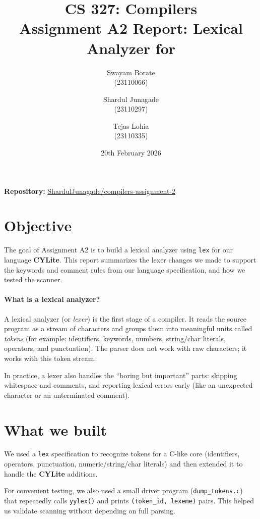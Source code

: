 \documentclass[11pt]{article}
\title{CS 327: Compilers\\Assignment A2 Report: Lexical Analyzer for \lang}
\author{Swayam Borate\\(23110066) \and Shardul Junagade\\(23110297) \and Tejas Lohia\\(23110335)}
\date{20th February 2026}
\newcommand{\lang}{\textbf{CYLite}}
\begin{document}
\maketitle

\noindent\textbf{Repository:} \href{https://github.com/ShardulJunagade/compilers-assignment-2}{ShardulJunagade/compilers-assignment-2}

\section{Objective}
The goal of Assignment A2 is to build a lexical analyzer using \texttt{lex} for our language \lang{}.
This report summarizes the lexer changes we made to support the keywords and comment rules from our language specification, and how we tested the scanner.

\paragraph{What is a lexical analyzer?}
A lexical analyzer (or \emph{lexer}) is the first stage of a compiler.
It reads the source program as a stream of characters and groups them into meaningful units called \emph{tokens} (for example: identifiers, keywords, numbers, string/char literals, operators, and punctuation).
The parser does not work with raw characters; it works with this token stream.

In practice, a lexer also handles the ``boring but important'' parts: skipping whitespace and comments, and reporting lexical errors early (like an unexpected character or an unterminated comment).

\section{What we built}
We used a \texttt{lex} specification to recognize tokens for a C-like core (identifiers, operators, punctuation, numeric/string/char literals) and then extended it to handle the \lang{} additions.

For convenient testing, we also used a small driver program (\texttt{dump\_tokens.c}) that repeatedly calls \texttt{yylex()} and prints \texttt{(token\_id, lexeme)} pairs.
This helped us validate scanning without depending on full parsing.
\end{document}
